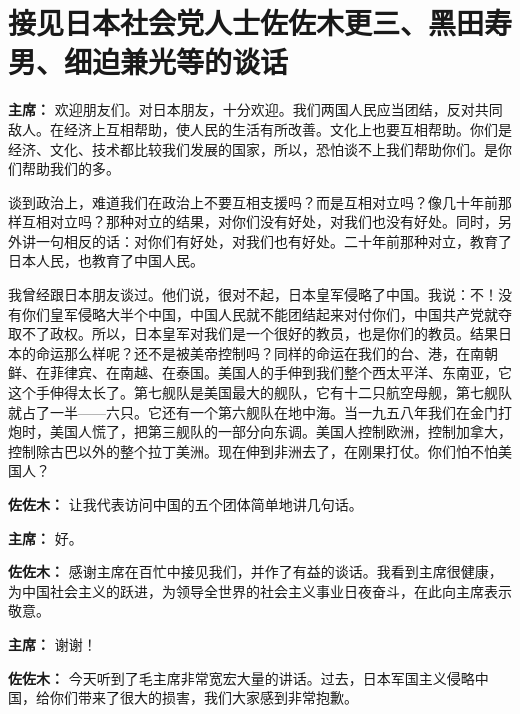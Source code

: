 \section[接见日本社会党人士佐佐木更三、黑田寿男、细迫兼光等的谈话（一九六四年七月十日）]{接见日本社会党人士佐佐木更三、黑田寿男、细迫兼光等的谈话}


\begin{duihua}

\item[\textbf{主席：}] 欢迎朋友们。对日本朋友，十分欢迎。我们两国人民应当团结，反对共同敌人。在经济上互相帮助，使人民的生活有所改善。文化上也要互相帮助。你们是经济、文化、技术都比较我们发展的国家，所以，恐怕谈不上我们帮助你们。是你们帮助我们的多。

谈到政治上，难道我们在政治上不要互相支援吗？而是互相对立吗？像几十年前那样互相对立吗？那种对立的结果，对你们没有好处，对我们也没有好处。同时，另外讲一句相反的话：对你们有好处，对我们也有好处。二十年前那种对立，教育了日本人民，也教育了中国人民。

我曾经跟日本朋友谈过。他们说，很对不起，日本皇军侵略了中国。我说：不！没有你们皇军侵略大半个中国，中国人民就不能团结起来对付你们，中国共产党就夺取不了政权。所以，日本皇军对我们是一个很好的教员，也是你们的教员。结果日本的命运那么样呢？还不是被美帝控制吗？同样的命运在我们的台、港，在南朝鲜、在菲律宾、在南越、在泰国。美国人的手伸到我们整个西太平洋、东南亚，它这个手伸得太长了。第七舰队是美国最大的舰队，它有十二只航空母舰，第七舰队就占了一半——六只。它还有一个第六舰队在地中海。当一九五八年我们在金门打炮时，美国人慌了，把第三舰队的一部分向东调。美国人控制欧洲，控制加拿大，控制除古巴以外的整个拉丁美洲。现在伸到非洲去了，在刚果打仗。你们怕不怕美国人？

\item[\textbf{佐佐木：}] 让我代表访问中国的五个团体简单地讲几句话。

\item[\textbf{主席：}] 好。

\item[\textbf{佐佐木：}] 感谢主席在百忙中接见我们，并作了有益的谈话。我看到主席很健康，为中国社会主义的跃进，为领导全世界的社会主义事业日夜奋斗，在此向主席表示敬意。

\item[\textbf{主席：}] 谢谢！

\item[\textbf{佐佐木：}] 今天听到了毛主席非常宽宏大量的讲话。过去，日本军国主义侵略中国，给你们带来了很大的损害，我们大家感到非常抱歉。


\end{duihua}
